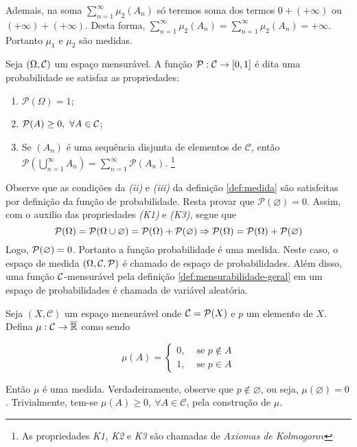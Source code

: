 Ademais, na soma $\displaystyle \sum_{n = 1}^\infty \mu_2(A_n)$ só teremos soma dos termos $0 + (+ \infty)$ ou $(+\infty) + (+\infty)$.
Desta forma, $\displaystyle \sum_{n = 1}^\infty \mu_2(A_n) = \sum_{n = 1}^\infty \mu_2(A_n) = +\infty$.
Portanto $\mu_1$ e $\mu_2$ são medidas.

\begin{example}[Probabilidade]
	Seja $(\Omega, \operatorname{\mathcal{C}})$ um espaço mensurável.
	A função $\mathcal{P}:\operatorname{\mathcal{C}} \to [0,1]$ é dita uma probabilidade se satisfaz as propriedades:
	\begin{enumerate}[label* =(K\arabic*)]
		\item $\mathcal{P}(\Omega) = 1$;
		\item $\mathcal{P}(A) \geq 0,\ \forall A \in \operatorname{\mathcal{C}}$;
		\item Se $(A_n)$ é uma sequência disjunta de elementos de  $\mathcal{C}$, então 
		$\displaystyle\mathcal{P}\left(\bigcup_{n = 1}^\infty A_n\right) = \sum_{n = 1}^\infty\mathcal{P}(A_n)$.
		\footnote{As propriedades \textit{K1, K2} e \textit{K3} são chamadas de \textit{Axiomas de Kolmogorov}}
	\end{enumerate}
\end{example}

Observe que as condições da \textit{(ii)} e \textit{(iii)} da definição \ref{def:medida} são satisfeitas por definição da função de probabilidade.
Resta provar que $\mathcal{P}(\varnothing) = 0$.
Assim, com o auxilio das propriedades \textit{(K1)} e \textit{(K3)}, segue que 
$$
\operatorname{\mathcal{P}}(\Omega)
= 
\operatorname{\mathcal{P}}(\Omega \cup \varnothing)
= 
\operatorname{\mathcal{P}}(\Omega) + \operatorname{\mathcal{P}}(\varnothing)
\Rightarrow
\operatorname{\mathcal{P}}(\Omega)
= 
\operatorname{\mathcal{P}}(\Omega) + \operatorname{\mathcal{P}}(\varnothing)
$$
Logo, $\operatorname{\mathcal{P}}(\varnothing) = 0$. 
Portanto a função probabilidade é uma medida.
Neste caso, o espaço de medida $(\Omega, \operatorname{\mathcal{C}}, \operatorname{\mathcal{P}})$ é chamado de espaço de probabilidades.
Além disso, uma função $\operatorname{\mathcal{C}}$-mensurável pela definição \ref{def:mensurabilidade-geral} em um espaço de probabilidades é chamada de variável aleatória.

\begin{example}
\label{ex:medida-concentrada-em-p}
    Seja $(X, \mathcal{C})$ um espaço mensurável onde $\operatorname{\mathcal{C}} = \mathcal{P}(X)$ e $p$ um elemento de $X$.
    Defina $\mu: \mathcal{C} \to \operatorname{\overline{\mathbb{R}}}$  como sendo


$$\mu(A) = \left\{\begin{array}{cc}
0, & \textrm{\ se \ } p \notin A \\
1, & \textrm{\ se \ } p \in A 
\end{array}\right.$$


Então $\mu$ é uma medida.
Verdadeiramente, observe que $p \notin \varnothing$, ou seja, $\mu(\varnothing) = 0$.
Trivialmente, tem-se $\mu(A) \geq 0,\ \forall A \in \mathcal{C}$, pela construção de $\mu$.



\end{example}

